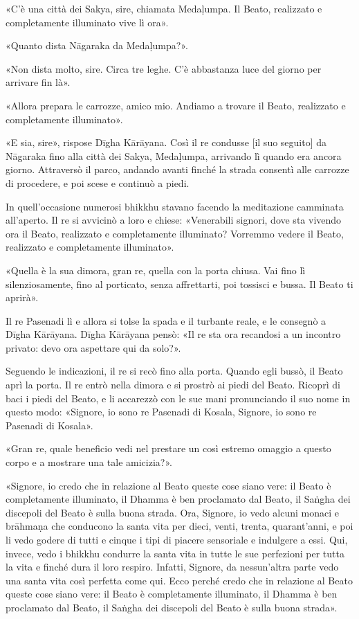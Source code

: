 «C’è una città dei Sakya, sire, chiamata Medaḷumpa. Il Beato, realizzato e
completamente illuminato vive lì ora».

«Quanto dista Nāgaraka da Medaḷumpa?».

«Non dista molto, sire. Circa tre leghe. C’è abbastanza luce del giorno per
arrivare fin là».

«Allora prepara le carrozze, amico mio. Andiamo a trovare il Beato, realizzato e
completamente illuminato».

«E sia, sire», rispose Dīgha Kārāyana. Così il re condusse [il suo seguito] da
Nāgaraka fino alla città dei Sakya, Medaḷumpa, arrivando lì quando era ancora
giorno. Attraversò il parco, andando avanti finché la strada consentì alle
carrozze di procedere, e poi scese e continuò a piedi.

In quell’occasione numerosi bhikkhu stavano facendo la meditazione camminata
all’aperto. Il re si avvicinò a loro e chiese: «Venerabili signori, dove sta
vivendo ora il Beato, realizzato e completamente illuminato? Vorremmo vedere il
Beato, realizzato e completamente illuminato».

«Quella è la sua dimora, gran re, quella con la porta chiusa. Vai fino lì
silenziosamente, fino al porticato, senza affrettarti, poi tossisci e bussa. Il
Beato ti aprirà».

Il re Pasenadi lì e allora si tolse la spada e il turbante reale, e le consegnò
a Dīgha Kārāyana. Dīgha Kārāyana pensò: «Il re sta ora recandosi a un incontro
privato: devo ora aspettare qui da solo?».

Seguendo le indicazioni, il re si recò fino alla porta. Quando egli bussò, il
Beato aprì la porta. Il re entrò nella dimora e si prostrò ai piedi del Beato.
Ricoprì di baci i piedi del Beato, e li accarezzò con le sue mani pronunciando
il suo nome in questo modo: «Signore, io sono re Pasenadi di Kosala, Signore, io
sono re Pasenadi di Kosala».

«Gran re, quale beneficio vedi nel prestare un così estremo omaggio a questo
corpo e a mostrare una tale amicizia?».

«Signore, io credo che in relazione al Beato queste cose siano vere: il Beato è
completamente illuminato, il Dhamma è ben proclamato dal Beato, il Saṅgha dei
discepoli del Beato è sulla buona strada. Ora, Signore, io vedo alcuni monaci e
brāhmaṇa che conducono la santa vita per dieci, venti, trenta, quarant’anni, e
poi li vedo godere di tutti e cinque i tipi di piacere sensoriale e indulgere a
essi. Qui, invece, vedo i bhikkhu condurre la santa vita in tutte le sue
perfezioni per tutta la vita e finché dura il loro respiro. Infatti, Signore, da
nessun’altra parte vedo una santa vita così perfetta come qui. Ecco perché credo
che in relazione al Beato queste cose siano vere: il Beato è completamente
illuminato, il Dhamma è ben proclamato dal Beato, il Saṅgha dei discepoli del
Beato è sulla buona strada».

